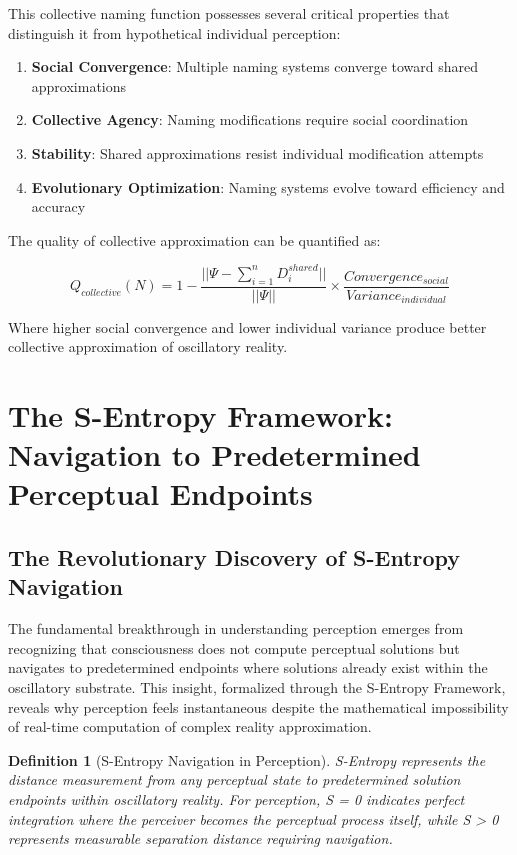 \documentclass[12pt]{article}
\newtheorem{definition}{Definition}
\begin{document}
This collective naming function possesses several critical properties that distinguish it from hypothetical individual perception:

\begin{enumerate}
\item \textbf{Social Convergence}: Multiple naming systems converge toward shared approximations
\item \textbf{Collective Agency}: Naming modifications require social coordination
\item \textbf{Stability}: Shared approximations resist individual modification attempts
\item \textbf{Evolutionary Optimization}: Naming systems evolve toward efficiency and accuracy
\end{enumerate}

The quality of collective approximation can be quantified as:

$$Q_{collective}(N) = 1 - \frac{||\Psi - \sum_{i=1}^{n} D_i^{shared}||}{||\Psi||} \times \frac{Convergence_{social}}{Variance_{individual}}$$

Where higher social convergence and lower individual variance produce better collective approximation of oscillatory reality.

\section{The S-Entropy Framework: Navigation to Predetermined Perceptual Endpoints}

\subsection{The Revolutionary Discovery of S-Entropy Navigation}

The fundamental breakthrough in understanding perception emerges from recognizing that consciousness does not compute perceptual solutions but navigates to predetermined endpoints where solutions already exist within the oscillatory substrate. This insight, formalized through the S-Entropy Framework, reveals why perception feels instantaneous despite the mathematical impossibility of real-time computation of complex reality approximation.

\begin{definition}[S-Entropy Navigation in Perception]
S-Entropy represents the distance measurement from any perceptual state to predetermined solution endpoints within oscillatory reality. For perception, S = 0 indicates perfect integration where the perceiver becomes the perceptual process itself, while S > 0 represents measurable separation distance requiring navigation.
\end{definition}
\end{document}
